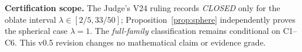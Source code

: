 \documentclass[11pt,a4paper]{article}
\numberwithin{equation}{section}
\theoremstyle{definition}
\theoremstyle{remark}
\begin{document}
\noindent\textbf{Certification scope.}
The Judge's V24 ruling records \emph{CLOSED} only for the oblate interval
$\lambda\in[2/5,33/50]$; Proposition~\ref{prop:sphere} independently
proves the spherical case $\lambda=1$.
The \emph{full-family} classification remains conditional on C1--C6.
This v0.5 revision changes no mathematical claim or evidence grade.
\clearpage
\tableofcontents
\clearpage




\begingroup
{}


\endgroup
\end{document}
